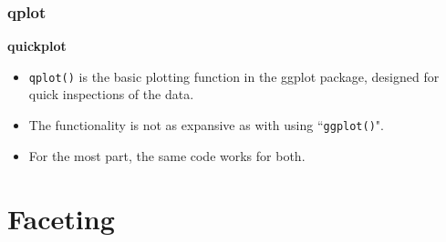 \documentclass{beamer}
\begin{document}
\begin{frame}
	\frametitle{qplot}
	\Large
	\noindent \textbf{quickplot}
	\begin{itemize}
		\item \texttt{qplot()} is the basic plotting function in the ggplot package, designed for quick inspections of the data.
		\item The functionality is not as expansive as with using ``\texttt{ggplot()}".
		\item For the most part, the same code works for both.
	\end{itemize}
	
\end{frame}
%	

\section{Faceting}
\end{document}
